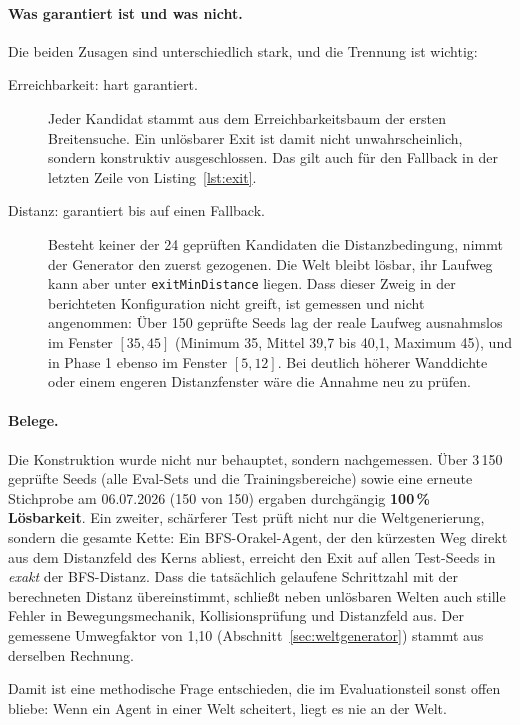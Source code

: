 \documentclass[11pt,a4paper]{article}
\begin{document}
\paragraph{Was garantiert ist und was nicht.} Die beiden Zusagen sind
unterschiedlich stark, und die Trennung ist wichtig:

\begin{description}
  \item[Erreichbarkeit: hart garantiert.] Jeder Kandidat stammt aus dem
    Erreichbarkeitsbaum der ersten Breitensuche. Ein unlösbarer Exit ist damit
    nicht unwahrscheinlich, sondern konstruktiv ausgeschlossen. Das gilt auch
    für den Fallback in der letzten Zeile von Listing~\ref{lst:exit}.
  \item[Distanz: garantiert bis auf einen Fallback.] Besteht keiner der 24
    geprüften Kandidaten die Distanzbedingung, nimmt der Generator den zuerst
    gezogenen. Die Welt bleibt lösbar, ihr Laufweg kann aber unter
    \texttt{exitMinDistance} liegen. Dass dieser Zweig in der berichteten
    Konfiguration nicht greift, ist gemessen und nicht angenommen: Über 150
    geprüfte Seeds lag der reale Laufweg ausnahmslos im Fenster
    $[35, 45]$ (Minimum 35, Mittel 39,7 bis 40,1, Maximum 45), und in
    Phase 1 ebenso im Fenster $[5, 12]$. Bei deutlich höherer Wanddichte oder
    einem engeren Distanzfenster wäre die Annahme neu zu prüfen.
\end{description}

\paragraph{Belege.} Die Konstruktion wurde nicht nur behauptet, sondern
nachgemessen. Über 3\,150 geprüfte Seeds (alle Eval-Sets und die
Trainingsbereiche) sowie eine erneute Stichprobe am 06.07.2026 (150 von 150)
ergaben durchgängig \textbf{100\,\% Lösbarkeit}. Ein zweiter, schärferer Test
prüft nicht nur die Weltgenerierung, sondern die gesamte Kette: Ein
BFS-Orakel-Agent, der den kürzesten Weg direkt aus dem Distanzfeld des Kerns
abliest, erreicht den Exit auf allen Test-Seeds in \emph{exakt} der
BFS-Distanz. Dass die tatsächlich gelaufene Schrittzahl mit der berechneten
Distanz übereinstimmt, schließt neben unlösbaren Welten auch stille Fehler in
Bewegungsmechanik, Kollisionsprüfung und Distanzfeld aus. Der gemessene
Umwegfaktor von 1,10 (Abschnitt~\ref{sec:weltgenerator}) stammt aus derselben
Rechnung.

Damit ist eine methodische Frage entschieden, die im Evaluationsteil sonst
offen bliebe: Wenn ein Agent in einer Welt scheitert, liegt es nie an der
Welt.
\end{document}
